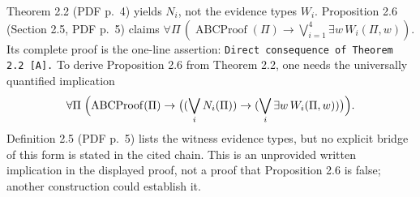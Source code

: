 \documentclass[11pt]{article}
\begin{document}
Theorem 2.2 (PDF p.~4) yields $N_i$, not the evidence types $W_i$. Proposition 2.6 (Section 2.5, PDF p.~5) claims $\forall\Pi\,(\operatorname{ABCProof}(\Pi)\to\bigvee_{i=1}^4\exists w\,W_i(\Pi,w))$. Its complete proof is the one-line assertion: \texttt{Direct consequence of Theorem 2.2 [A].} To derive Proposition 2.6 from Theorem 2.2, one needs the universally quantified implication
\[\forall\Pi\;\Bigl(\operatorname{ABCProof}(\Pi)\to\bigl((\bigvee_iN_i(\Pi))\to(\bigvee_i\exists w\,W_i(\Pi,w))\bigr)\Bigr).\]
Definition 2.5 (PDF p.~5) lists the witness evidence types, but no explicit bridge of this form is stated in the cited chain. This is an unprovided written implication in the displayed proof, not a proof that Proposition 2.6 is false; another construction could establish it.
\end{document}
